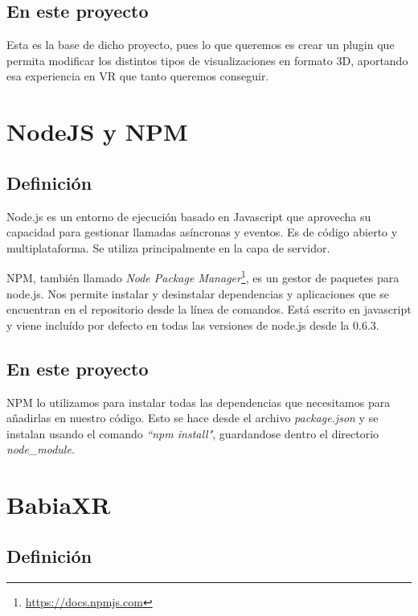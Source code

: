 \documentclass[a4paper, 12pt]{book}
\begin{document}
\subsection{En este proyecto}
Esta es la base de dicho proyecto, pues lo que queremos es crear un plugin que permita modificar los distintos tipos de visualizaciones en formato 3D, aportando esa experiencia en VR que tanto queremos conseguir.



\section{NodeJS y NPM}
\label{sec:nodejs}
\subsection{Definición}
Node.js \cite{syed:_nodejs} es un entorno de ejecución basado en Javascript que aprovecha su capacidad para gestionar llamadas asíncronas y eventos. Es de código abierto y multiplataforma. Se utiliza principalmente en la capa de servidor.


NPM, también llamado \textit{Node Package Manager}\footnote{\url{https://docs.npmjs.com}}, es un gestor de paquetes para node.js. Nos permite instalar y desinstalar dependencias y aplicaciones que se encuentran en el repositorio desde la línea de comandos. Está escrito en javascript y viene incluído por defecto en todas las versiones de node.js desde la 0.6.3.

\subsection{En este proyecto}

NPM lo utilizamos para instalar todas las dependencias que necesitamos para añadirlas en nuestro código. Esto se hace desde el archivo \textit{package.json} y se instalan usando el comando \textit{``npm install"}, guardandose dentro el directorio \textit{node\_module}.


\section{BabiaXR}
\label{sec:babiaxr}
\subsection{Definición}
\end{document}
